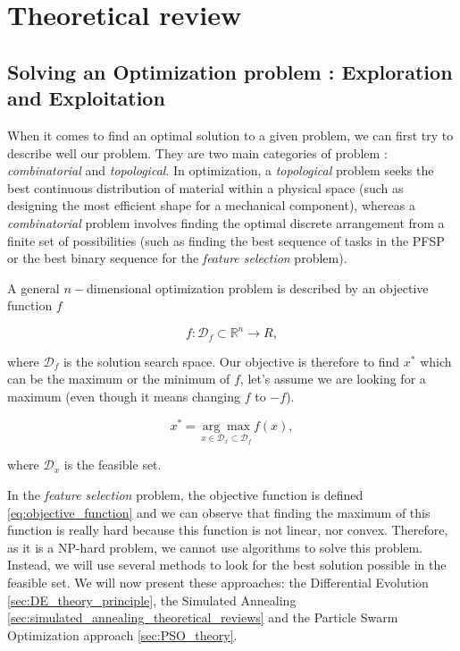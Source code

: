 \documentclass[12pt, openany]{article}
\begin{document}

\section{Theoretical review}\label{sec:theoretical_review}

\subsection{Solving an Optimization problem : Exploration and Exploitation}\label{sec:optimization_problem_exploration_exploitation}

When it comes to find an optimal solution to a given problem, we can first try to describe well our problem. They are two main categories of problem : \emph{combinatorial} and \emph{topological}. In optimization, a \emph{topological} problem seeks the best continuous distribution of material within a physical space (such as designing the most efficient shape for a mechanical component), whereas a \emph{combinatorial} problem involves finding the optimal discrete arrangement from a finite set of possibilities (such as finding the best sequence of tasks in the PFSP or the best binary sequence for the \textit{feature selection} problem).

A general $n-$dimensional optimization problem is described by an objective function $f$

\begin{equation}
    f:\mathcal{D}_f \subset \mathbb{R}^n \to R ,
\end{equation}

where $\mathcal{D}_f$ is the solution search space. Our objective is therefore to find $x^*$ which can be the maximum or the minimum of $f$, let's assume we are looking for a maximum (even though it means changing $f$ to $-f$).

\begin{equation}
    x^* = \underset{x \in \mathcal{D}_x \subset \mathcal{D}_f}{\arg \max} f(x),
\end{equation}

where $\mathcal{D}_x$ is the feasible set.

In the \textit{feature selection} problem, the objective function is defined \eqref{eq:objective_function} and we can observe that finding the maximum of this function is really hard because this function is not linear, nor convex. Therefore, as it is a NP-hard problem, we cannot use algorithms to solve this problem. Instead, we will use several methods to look for the best solution possible in the feasible set. We will now present these approaches: the Differential Evolution \ref{sec:DE_theory_principle}, the Simulated Annealing \ref{sec:simulated_annealing_theoretical_reviews} and the Particle Swarm Optimization approach \ref{sec:PSO_theory}.
\end{document}
